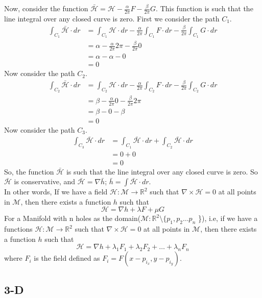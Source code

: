 \documentclass[a4paper]{article}
\begin{document}
Now, consider the function $\bar{\mathcal{H}} = \mathcal{H} - \frac{\alpha}{2\pi}F - \frac{\beta}{2\pi}G$. This function is such that the line integral over any closed curve is zero. First we consider the path $C_1$.
\begin{align*}
    \int_{C_1} \bar{\mathcal{H}} \cdot dr &= \int_{C_1} \mathcal{H} \cdot dr - \frac{\alpha}{2\pi} \int_{C_1} F \cdot dr - \frac{\beta}{2\pi} \int_{C_1} G \cdot dr\\
    &= \alpha - \frac{\alpha}{2\pi} 2\pi - \frac{\beta}{2\pi} 0\\
    &= \alpha - \alpha - 0 \\&= 0
\end{align*}
Now consider the path $C_2$.
\begin{align*}
    \int_{C_2} \bar{\mathcal{H}} \cdot dr &= \int_{C_2} \mathcal{H} \cdot dr - \frac{\alpha}{2\pi} \int_{C_2} F \cdot dr - \frac{\beta}{2\pi} \int_{C_2} G \cdot dr\\
    &= \beta - \frac{\alpha}{2\pi} 0 - \frac{\beta}{2\pi} 2\pi\\
    &= \beta - 0 - \beta \\&= 0
\end{align*}
Now consider the path $C_3$.
\begin{align*}
    \int_{C_3} \bar{\mathcal{H}} \cdot dr &= \int_{C_1} \bar{\mathcal{H}} \cdot dr + \int_{C_2} \bar{\mathcal{H}} \cdot dr\\
    &= 0 + 0 \\
    &= 0
\end{align*}
So, the function $\bar{\mathcal{H}}$ is such that the line integral over any closed curve is zero. So $\bar{\mathcal{H}}$ is conservative, and $\bar{\mathcal{H}} = \nabla \bar{h}$; $\bar{h} = \int \bar{\mathcal{H}} \cdot dr$.  \\
In other words, If we have a field \(\mathcal{H}: \mathcal{M} \rightarrow \mathbb{R}^2\) such that \(\nabla \times \mathcal{H} = 0\) at all points in $\mathcal{M}$, then there exists a function $h$ such that
\[
    \mathcal{H} = \nabla h + \lambda F + \mu G\]
For a Manifold with n holes as the domain($\mathcal{M} : \mathbb{R}^2 \setminus\{p_1, p_2 \dots p_n$ \}), i.e, if we have a functions \(\mathcal{H}: \mathcal{M} \rightarrow \mathbb{R}^2\) such that \(\nabla \times \mathcal{H} = 0\) at all points in $\mathcal{M}$, then there exists a function $h$ such that
\[
    \mathcal{H} = \nabla h + \lambda_1 F_1 + \lambda_2 F_2 + \dots + \lambda_n F_n\]
where $F_i$ is the field defined as $F_i = F(x-p_{i_x}, y-p_{i_y})$.
\subsection{3-D}
\end{document}
